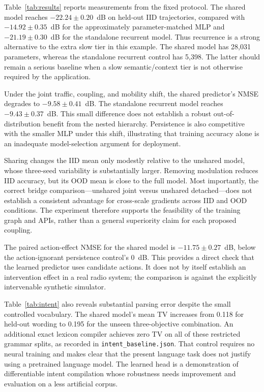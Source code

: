 Table~\ref{tab:results} reports measurements from the fixed protocol. The
shared model reaches $-22.24\pm0.20$~dB on held-out IID trajectories, compared
with $-14.92\pm0.35$~dB for the approximately parameter-matched MLP and
$-21.19\pm0.30$~dB for the standalone recurrent model. Thus recurrence is a
strong alternative to the extra slow tier in this example. The shared model
has 28,031 parameters, whereas the standalone recurrent control has 5,398.
The latter should remain a serious baseline when a slow semantic/context tier
is not otherwise required by the application.

Under the joint traffic, coupling, and mobility shift, the shared predictor's
NMSE degrades to $-9.58\pm0.41$~dB. The standalone recurrent model reaches
$-9.43\pm0.37$~dB. This small difference does not establish a robust
out-of-distribution benefit from the nested hierarchy. Persistence is also
competitive with the smaller MLP under this shift, illustrating that training
accuracy alone is an inadequate model-selection argument for deployment.

Sharing changes the IID mean only modestly relative to the unshared model,
whose three-seed variability is substantially larger. Removing modulation
reduces IID accuracy, but its OOD mean is close to the full model. Most
importantly, the correct bridge comparison---unshared joint versus unshared
detached---does not establish a consistent advantage for cross-scale gradients
across IID and OOD conditions. The experiment therefore supports the feasibility
of the training graph and APIs, rather than a general superiority claim for
each proposed coupling.

The paired action-effect NMSE for the shared model is
$-11.75\pm0.27$~dB, below the action-ignorant persistence control's 0~dB.
This provides a direct check that the learned predictor uses candidate actions.
It does not by itself establish an intervention effect in a real radio system;
the comparison is against the explicitly intervenable synthetic simulator.

Table~\ref{tab:intent} also reveals substantial parsing error despite the small
controlled vocabulary. The shared model's mean TV increases from 0.118 for
held-out wording to 0.195 for the unseen three-objective combination. An
additional exact lexicon compiler achieves zero TV on all of these restricted
grammar splits, as recorded in \texttt{intent\_baseline.json}. That control
requires no neural training and makes clear that the present language task
does not justify using a pretrained language model. The learned head is a
demonstration of differentiable intent compilation whose robustness needs
improvement and evaluation on a less artificial corpus.

